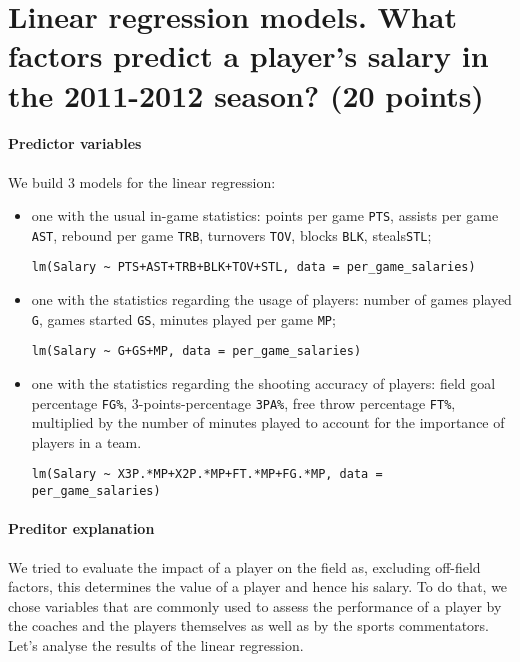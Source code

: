 
\section*{Linear regression models. What factors predict a player’s salary in the 2011-2012 season? (20 points)}
\label{subsec:3Q2}

\paragraph{Predictor variables}We build 3 models for the linear regression: 
\begin{itemize}
\item one with the usual in-game statistics: points per game \texttt{PTS}, assists per game \texttt{AST}, rebound per game \texttt{TRB}, turnovers \texttt{TOV}, blocks \texttt{BLK}, steals\texttt{STL};
\begin{verbatim}
lm(Salary ~ PTS+AST+TRB+BLK+TOV+STL, data = per_game_salaries)
\end{verbatim}
\end{itemize}
\begin{itemize}
\item one with the statistics regarding the usage of players: number of games played \texttt{G}, games started \texttt{GS}, minutes played per game \texttt{MP};
\begin{verbatim}
lm(Salary ~ G+GS+MP, data = per_game_salaries)
\end{verbatim}
\end{itemize}
\begin{itemize}
\item one with the statistics regarding the shooting accuracy of players: field goal percentage \texttt{FG\%}, 3-points-percentage \texttt{3PA\%}, free throw percentage \texttt{FT\%}, multiplied by the number of minutes played to account for the importance of players in a team.
\begin{verbatim}
lm(Salary ~ X3P.*MP+X2P.*MP+FT.*MP+FG.*MP, data = per_game_salaries)
\end{verbatim}
\end{itemize}

\paragraph{Preditor explanation}We tried to evaluate the impact of a player on the field as, excluding off-field factors, this determines the value of a player and hence his salary. To do that, we chose variables that are commonly used to assess the performance of a player by the coaches and the players themselves as well as by the sports commentators. Let's analyse the results of the linear regression.

